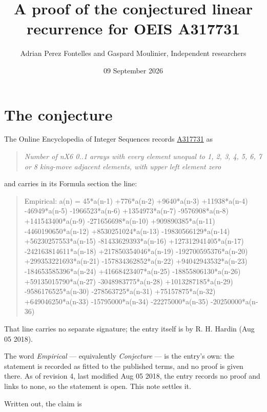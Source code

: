\documentclass[11pt]{article}
\title{A proof of the conjectured linear recurrence for OEIS A317731}
\author{Adrian Perez Fontelles and Gaspard Moulinier, Independent researchers}
\date{09 September 2026}
\theoremstyle{definition}
\begin{document}
\maketitle
\section{The conjecture}

The Online Encyclopedia of Integer Sequences records \href{https://oeis.org/A317731}{A317731} as

\begin{quote}\itshape Number of nX6 0..1 arrays with every element unequal to 1, 2, 3, 4, 5, 6, 7 or 8 king-move adjacent elements, with upper left element zero\end{quote}

and carries in its Formula section the line:

\begin{quote}\ttfamily Empirical: a(n) = 45*a(n-1) +776*a(n-2) +9640*a(n-3) +11938*a(n-4) -46949*a(n-5) -1966523*a(n-6) +1354973*a(n-7) -9576908*a(n-8) +141543400*a(n-9) -271656698*a(n-10) +909890385*a(n-11) -4460190650*a(n-12) +8530251024*a(n-13) -19830566129*a(n-14) +56230257553*a(n-15) -81433629393*a(n-16) +127312941405*a(n-17) -242163814611*a(n-18) +217850354046*a(n-19) -192700595376*a(n-20) +299353221693*a(n-21) -157834362852*a(n-22) +94042943532*a(n-23) -184653585396*a(n-24) +41668423407*a(n-25) -18855806130*a(n-26) +59135015790*a(n-27) -3048983775*a(n-28) +1013287185*a(n-29) -9586176525*a(n-30) -278563725*a(n-31) +75157875*a(n-32) +649046250*a(n-33) -15795000*a(n-34) -22275000*a(n-35) -20250000*a(n-36)\end{quote}

That line carries no separate signature; the entry itself is by R. H. Hardin (Aug 05 2018).

The word {\itshape Empirical} --- equivalently {\itshape Conjecture} --- is the entry's own: the statement is recorded as fitted to the published terms, and no proof is given there. As of revision 4, last modified Aug 05 2018, the entry records no proof and links to none, so the statement is open. This note settles it.

Written out, the claim is
\end{document}
